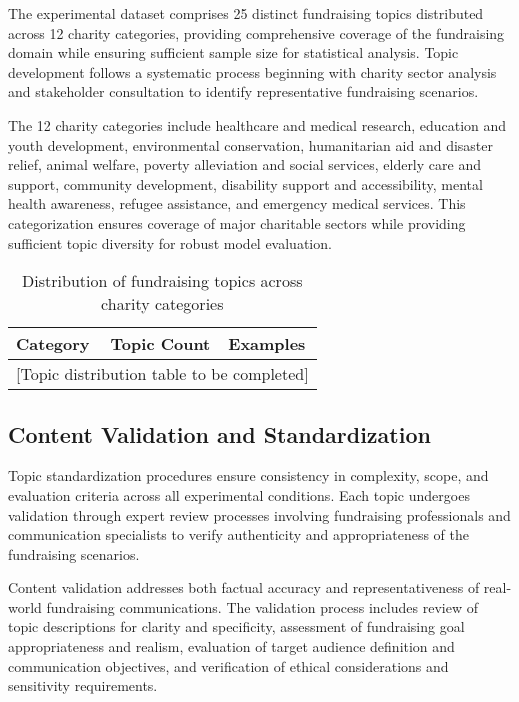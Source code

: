 The experimental dataset comprises 25 distinct fundraising topics distributed across 12 charity categories, providing comprehensive coverage of the fundraising domain while ensuring sufficient sample size for statistical analysis. Topic development follows a systematic process beginning with charity sector analysis and stakeholder consultation to identify representative fundraising scenarios.

The 12 charity categories include healthcare and medical research, education and youth development, environmental conservation, humanitarian aid and disaster relief, animal welfare, poverty alleviation and social services, elderly care and support, community development, disability support and accessibility, mental health awareness, refugee assistance, and emergency medical services. This categorization ensures coverage of major charitable sectors while providing sufficient topic diversity for robust model evaluation.

\begin{table}[htbp]
    \centering
    \caption{Distribution of fundraising topics across charity categories}
    \label{tab:topic-distribution}
    \begin{tabular}{|l|c|l|}
    \hline
    \textbf{Category} & \textbf{Topic Count} & \textbf{Examples} \\
    \hline
    \multicolumn{3}{|c|}{[Topic distribution table to be completed]} \\
    \hline
    \end{tabular}
\end{table}

\subsection{Content Validation and Standardization}

Topic standardization procedures ensure consistency in complexity, scope, and evaluation criteria across all experimental conditions. Each topic undergoes validation through expert review processes involving fundraising professionals and communication specialists to verify authenticity and appropriateness of the fundraising scenarios.

Content validation addresses both factual accuracy and representativeness of real-world fundraising communications. The validation process includes review of topic descriptions for clarity and specificity, assessment of fundraising goal appropriateness and realism, evaluation of target audience definition and communication objectives, and verification of ethical considerations and sensitivity requirements.

